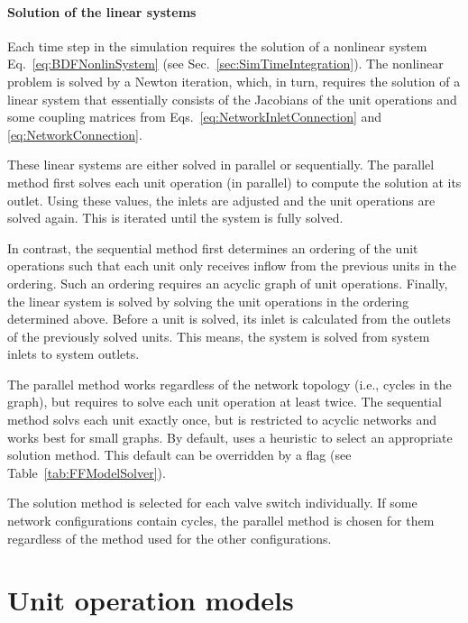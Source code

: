 \paragraph{Solution of the linear systems}
\label{par:MUOPNetworkLinearSolver}

Each time step in the simulation requires the solution of a nonlinear system Eq.~\eqref{eq:BDFNonlinSystem} (see Sec.~\ref{sec:SimTimeIntegration}).
The nonlinear problem is solved by a Newton iteration, which, in turn, requires the solution of a linear system that essentially consists of the Jacobians of the unit operations and some coupling matrices from Eqs.~\eqref{eq:NetworkInletConnection} and \eqref{eq:NetworkConnection}.

These linear systems are either solved in parallel or sequentially.
The parallel method first solves each unit operation (in parallel) to compute the solution at its outlet.
Using these values, the inlets are adjusted and the unit operations are solved again.
This is iterated until the system is fully solved.

In contrast, the sequential method first determines an ordering of the unit operations such that each unit only receives inflow from the previous units in the ordering.
Such an ordering requires an acyclic graph of unit operations.
Finally, the linear system is solved by solving the unit operations in the ordering determined above.
Before a unit is solved, its inlet is calculated from the outlets of the previously solved units.
This means, the system is solved from system inlets to system outlets.

The parallel method works regardless of the network topology (i.e., cycles in the graph), but requires to solve each unit operation at least twice.
The sequential method solvs each unit exactly once, but is restricted to acyclic networks and works best for small graphs.
By default, \CADET{} uses a heuristic to select an appropriate solution method.
This default can be overridden by a flag (see Table~\ref{tab:FFModelSolver}).

The solution method is selected for each valve switch individually.
If some network configurations contain cycles, the parallel method is chosen for them regardless of the method used for the other configurations.

\section{Unit operation models}

